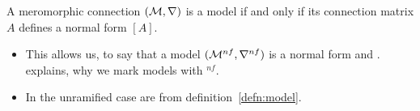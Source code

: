 \begin{thm}\label{thm:modelEqNormalForm}
  A meromorphic connection $(\mathcal{M},\nabla)$ is a model if and only if its
  connection matrix $A$ defines a normal form $[A]$.
  \begin{s-rem}
    \begin{itemize}
      \item This allows us, to say that a model $(\mathcal{M}^{nf},\nabla^{nf})$ is a
        normal form and .
         explains, why we mark models with ${}^{nf}$.
      \item In the unramified case are  from definition~\ref{defn:model}.
    \end{itemize}
  \end{s-rem}
\end{thm}
